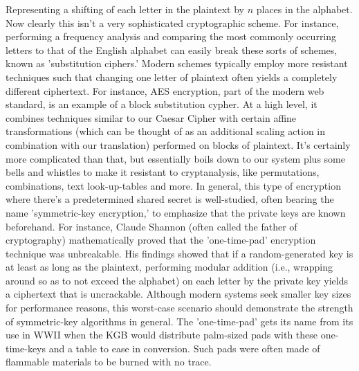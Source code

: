 \documentclass[11pt,a4paper]{article}
\begin{document}
Representing a shifting of each letter in the plaintext by $n$ places in the alphabet. Now clearly this isn't a very sophisticated cryptographic scheme. For instance, performing a frequency analysis and comparing the most commonly occurring letters to that of the English alphabet can easily break these sorts of schemes, known as 'substitution ciphers.' Modern schemes typically employ more resistant techniques such that changing one letter of plaintext often yields a completely different ciphertext.
  For instance, AES encryption, part of the modern web standard, is an example of a block substitution cypher. At a high level, it combines techniques similar to our Caesar Cipher with certain affine transformations (which can be thought of as an additional scaling action in combination with our translation) performed on blocks of plaintext. It's certainly more complicated than that, but essentially boils down to our system plus some bells and whistles to make it resistant to cryptanalysis, like permutations, combinations, text look-up-tables and more. In general, this type of encryption where there's a predetermined shared secret is well-studied, often bearing the name 'symmetric-key encryption,' to emphasize that the private keys are known beforehand. For instance, Claude Shannon (often called the father of cryptography) mathematically proved that the 'one-time-pad' encryption technique was unbreakable. His findings showed that if a random-generated key is at least as long as the plaintext, performing modular addition (i.e., wrapping around so as to not exceed the alphabet) on each letter by the private key yields a ciphertext that is uncrackable.\autocite{claude} Although modern systems seek smaller key sizes for performance reasons, this worst-case scenario should demonstrate the strength of symmetric-key algorithms in general. The 'one-time-pad' gets its name from its use in WWII when the KGB would distribute palm-sized pads with these one-time-keys and a table to ease in conversion. Such pads were often made of flammable materials to be burned with no trace.\autocite{lewand} 
  
\end{document}
